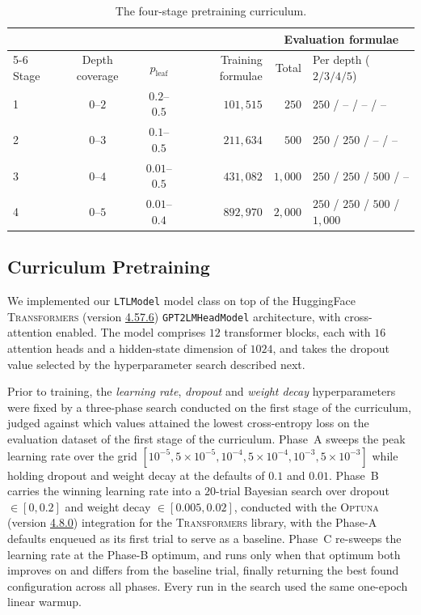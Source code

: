 \documentclass[titlepage,a4paper,11pt]{report}
\begin{document}
    \begin{table}[ht]
        \centering
        \caption{The four-stage pretraining curriculum.}
        \label{tab:curriculum}
        \begin{tabular}{lccrrl}
            \toprule
            & & & & \multicolumn{2}{c}{Evaluation formulae} \\
            \cmidrule(lr){5-6}
            Stage & Depth coverage & $p_{\text{leaf}}$ & Training formulae & Total & Per depth ($2/3/4/5$) \\
            \midrule
            1 & $0$--$2$ & $0.2$--$0.5$   & $101{,}515$ & $250$     & $250$ / -- / -- / -- \\
            2 & $0$--$3$ & $0.1$--$0.5$   & $211{,}634$ & $500$     & $250$ / $250$ / -- / -- \\
            3 & $0$--$4$ & $0.01$--$0.5$  & $431{,}082$ & $1{,}000$ & $250$ / $250$ / $500$ / -- \\
            4 & $0$--$5$ & $0.01$--$0.4$  & $892{,}970$ & $2{,}000$ & $250$ / $250$ / $500$ / $1{,}000$ \\
            \bottomrule
        \end{tabular}
    \end{table}
    
    \subsection{Curriculum Pretraining}\label{sec:curriculum_pretraining}
    We implemented our \texttt{LTLModel} model class on top of the HuggingFace \textsc{Transformers} (version \href{https://github.com/huggingface/transformers/tree/v4.57.6}{4.57.6}) \texttt{GPT2LMHeadModel} architecture, with cross-attention enabled. The model comprises $12$ transformer blocks, each with $16$ attention heads and a hidden-state dimension of $1024$, and takes the dropout value selected by the hyperparameter search described next.
    
    Prior to training, the \textit{learning rate}, \textit{dropout} and \textit{weight decay} hyperparameters were fixed by a three-phase search conducted on the first stage of the curriculum, judged against which values attained the lowest cross-entropy loss on the evaluation dataset of the first stage of the curriculum. Phase~A sweeps the peak learning rate over the grid $[10^{-5}, 5\times10^{-5}, 10^{-4}, 5\times10^{-4}, 10^{-3}, 5\times10^{-3}]$ while holding dropout and weight decay at the defaults of $0.1$ and $0.01$. Phase~B carries the winning learning rate into a $20$-trial Bayesian search over dropout $\in [0, 0.2]$ and weight decay $\in [0.005, 0.02]$, conducted with the \textsc{Optuna} (version \href{https://github.com/optuna/optuna/tree/v4.8.0}{4.8.0}) integration for the \textsc{Transformers} library, with the Phase-A defaults enqueued as its first trial to serve as a baseline. Phase~C re-sweeps the learning rate at the Phase-B optimum, and runs only when that optimum both improves on and differs from the baseline trial, finally returning the best found configuration across all phases. Every run in the search used the same one-epoch linear warmup.
    
\end{document}
